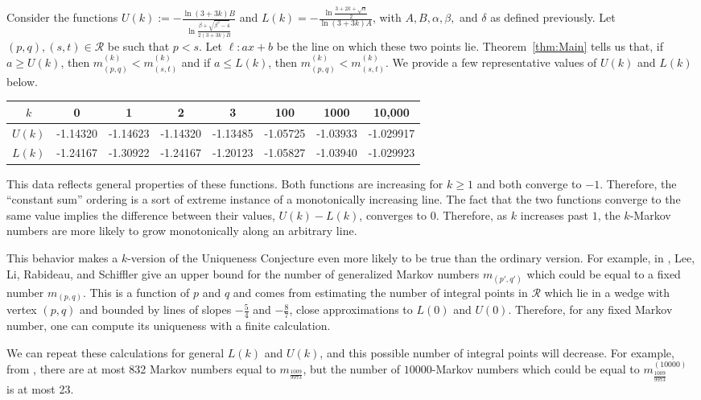 \documentclass{article}
\theoremstyle{remark}
\begin{document}
Consider the functions $U(k):= -\frac{\ln(3+3k)B}{\ln\frac{\beta+\sqrt{\beta^2-4}}{2(3+3k)B}}$ and $L(k) =  -\frac{\ln\frac{3+2k+\sqrt{\alpha}}{2}}{\ln(3+3k)A}$, with $A,B,\alpha,\beta,$ and $\delta$ as defined previously. Let $(p,q), (s,t) \in \mathcal{R}$ be such that $p < s$. Let $\ell: ax + b$ be the line on which these two points lie. Theorem~\ref{thm:Main} tells us that, if $a \geq U(k)$, then $m^{(k)}_{(p,q)} < m^{(k)}_{(s,t)}$ and if $a \leq L(k)$, then $m^{(k)}_{(p,q)} < m^{(k)}_{(s,t)}$. We provide a few representative values of $U(k)$ and $L(k)$ below.

\begin{center}
\begin{tabular}{|c|c|c|c|c|c|c|c|}\hline
 $k$    & 0 & 1 & 2 & 3 & 100 & 1000 & 10,000 \\\hline
 $U(k)$   & -1.14320 & -1.14623 & -1.14320 & -1.13485 & -1.05725 & -1.03933 & -1.029917\\\hline
 $L(k)$ & -1.24167 & -1.30922 & -1.24167& -1.20123& -1.05827 & -1.03940 & -1.029923\\ \hline
\end{tabular}
\end{center}

This data reflects general properties of these functions. Both functions are increasing for $k \geq 1$ and both converge to $-1$. Therefore, the ``constant sum'' ordering is a sort of extreme instance of a monotonically increasing line. The fact that the two functions converge to the same value implies the difference between their values, $U(k) - L(k)$, converges to 0. Therefore, as $k$ increases past $1$, the $k$-Markov numbers are more likely to grow monotonically along an arbitrary line. 

This behavior makes a $k$-version of the Uniqueness Conjecture even more likely to be true than the ordinary version. For example, in \cite[Corollary 1.5]{LLRS}, Lee, Li, Rabideau, and Schiffler give an upper bound for the number of generalized Markov numbers $m_{(p',q')}$ which could be equal to a fixed number $m_{(p,q)}$. This is a function of $p$ and $q$ and comes from estimating the number of integral points in $\mathcal{R}$ which lie in a wedge with vertex $(p,q)$ and bounded by lines of slopes $-\frac54$ and $-\frac87$, close approximations to $L(0)$ and $U(0)$. Therefore, for any fixed Markov number, one can compute its uniqueness with a finite calculation. 

We can repeat these calculations for general $L(k)$ and $U(k)$, and this possible number of integral points will decrease. For example, from \cite[Corollary 1.5]{LLRS}, there are at most 832 Markov numbers equal to $m_{\frac{1009}{9973}}$, but the number of $10000$-Markov numbers which could be equal to  $m^{(10000)}_{\frac{1009}{9973}}$ is at most 23. 
\end{document}
